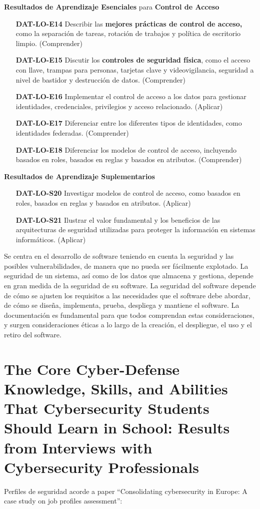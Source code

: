 \textbf{Resultados de Aprendizaje Esenciales} para \textbf{Control de Acceso}
\begin{itemize}
  \item[\textbf{DAT-LO-E14}] Describir las \textbf{mejores prácticas de control de acceso,} como la separación de tareas, rotación de trabajos y política de escritorio limpio. (Comprender)
  \item[\textbf{DAT-LO-E15}] Discutir los \textbf{controles de seguridad física}, como el acceso con llave, trampas para personas, tarjetas clave y videovigilancia, seguridad a nivel de bastidor y destrucción de datos. (Comprender)
  \item[\textbf{DAT-LO-E16}] Implementar el control de acceso a los datos para gestionar identidades, credenciales, privilegios y acceso relacionado. (Aplicar)
  \item[\textbf{DAT-LO-E17}] Diferenciar entre los diferentes tipos de identidades, como identidades federadas. (Comprender)
  \item[\textbf{DAT-LO-E18}] Diferenciar los modelos de control de acceso, incluyendo basados en roles, basados en reglas y basados en atributos. (Comprender)
\end{itemize}

\textbf{Resultados de Aprendizaje Suplementarios}

\begin{itemize}
  \item[\textbf{DAT-LO-S20}] Investigar modelos de control de acceso, como basados en roles, basados en reglas y basados en atributos. (Aplicar)
  \item[\textbf{DAT-LO-S21}] Ilustrar el valor fundamental y los beneficios de las arquitecturas de seguridad utilizadas para proteger la información en sistemas informáticos. (Aplicar)
\end{itemize}




\newpage
\begin{tcolorbox}
[colback=gray!5!white,colframe=blue!10!gray,title=Seguridad de Software] 
Se centra en el desarrollo de software teniendo en cuenta la seguridad y las posibles vulnerabilidades, de manera que no pueda ser fácilmente explotado.
La seguridad de un sistema, así como de los datos que almacena y gestiona, depende en gran medida de la seguridad de su software. La seguridad del software depende de cómo se ajusten los requisitos a las necesidades que el software debe abordar, de cómo se diseña, implementa, prueba, despliega y mantiene el software. La documentación es fundamental para que todos comprendan estas consideraciones, y surgen consideraciones éticas a lo largo de la creación, el despliegue, el uso y el retiro del software.\end{tcolorbox}

\section{The Core Cyber-Defense Knowledge, Skills, and Abilities
That Cybersecurity Students Should Learn in School: Results
from Interviews with Cybersecurity Professionals}
Perfiles de seguridad acorde a paper ``Consolidating cybersecurity in Europe: A case study on job profiles assessment'':
